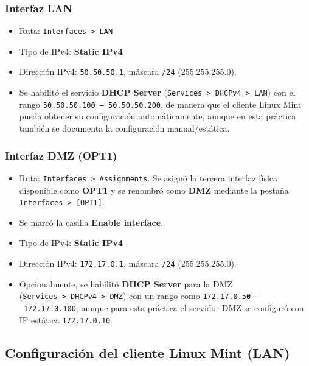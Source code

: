 \documentclass{article}
\providecommand{\tightlist}{%
  \setlength{\itemsep}{0pt}\setlength{\parskip}{0pt}}
\renewcommand{\_}{\oldunderscore\hskip0pt\relax}
\begin{document}
\hypertarget{interfaz-lan}{%
\subsubsection{Interfaz LAN}\label{interfaz-lan}}

\begin{itemize}
\tightlist
\item
  Ruta: \texttt{Interfaces\ \textgreater{}\ LAN}
\item
  Tipo de IPv4: \textbf{Static IPv4}
\item
  Dirección IPv4: \texttt{50.50.50.1}, máscara \texttt{/24}
  (255.255.255.0).
\item
  Se habilitó el servicio \textbf{DHCP Server}
  (\texttt{Services\ \textgreater{}\ DHCPv4\ \textgreater{}\ LAN}) con
  el rango \texttt{50.50.50.100\ –\ 50.50.50.200}, de manera que el
  cliente Linux Mint pueda obtener su configuración automáticamente,
  aunque en esta práctica también se documenta la configuración
  manual/estática.
\end{itemize}

\hypertarget{interfaz-dmz-opt1}{%
\subsubsection{Interfaz DMZ (OPT1)}\label{interfaz-dmz-opt1}}

\begin{itemize}
\tightlist
\item
  Ruta: \texttt{Interfaces\ \textgreater{}\ Assignments}. Se asignó la
  tercera interfaz física disponible como \textbf{OPT1} y se renombró
  como \textbf{DMZ} mediante la pestaña
  \texttt{Interfaces\ \textgreater{}\ {[}OPT1{]}}.
\item
  Se marcó la casilla \textbf{Enable interface}.
\item
  Tipo de IPv4: \textbf{Static IPv4}
\item
  Dirección IPv4: \texttt{172.17.0.1}, máscara \texttt{/24}
  (255.255.255.0).
\item
  Opcionalmente, se habilitó \textbf{DHCP Server} para la DMZ
  (\texttt{Services\ \textgreater{}\ DHCPv4\ \textgreater{}\ DMZ}) con
  un rango como \texttt{172.17.0.50\ –\ 172.17.0.100}, aunque para esta
  práctica el servidor DMZ se configuró con IP estática
  \texttt{172.17.0.10}.
\end{itemize}

\hypertarget{configuraciuxf3n-del-cliente-linux-mint-lan}{%
\subsection{Configuración del cliente Linux Mint
(LAN)}\label{configuraciuxf3n-del-cliente-linux-mint-lan}}
\end{document}
